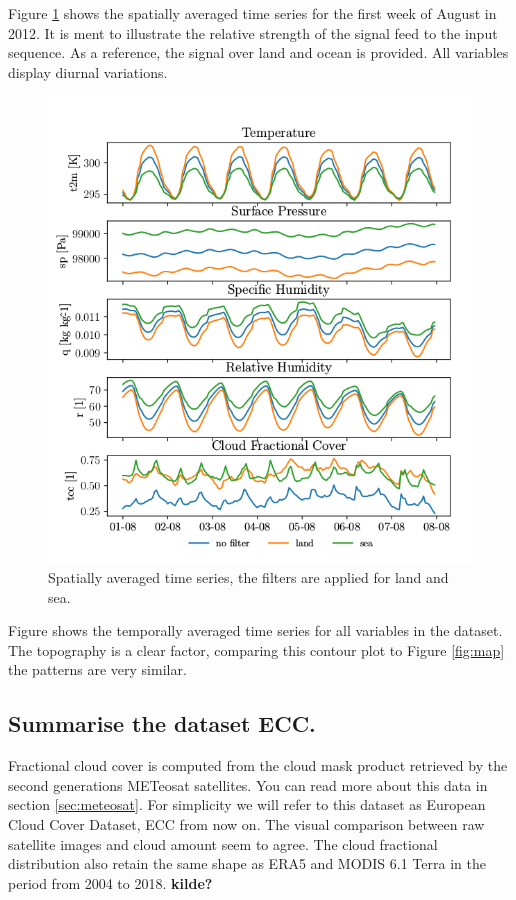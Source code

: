 Figure \ref{fig:random_week} shows the spatially averaged time series for the first week of August in 2012. It is ment to illustrate the relative strength of the signal feed to the input sequence. As a reference, the signal over land and ocean is provided. All variables display diurnal variations.

\begin{figure}[ht]
    \centering
    \includegraphics{python_figs/spatially_averaged_one_week_from_2012-08-01.png}
    \caption{Spatially averaged time series, the filters are applied for land and sea.}
    \label{fig:random_week}
\end{figure}
Figure %
shows the temporally averaged time series for all variables in the dataset. The topography is a clear factor, comparing this contour plot to Figure \ref{fig:map} the patterns are very similar. 





\subsection{Summarise the dataset ECC.}
Fractional cloud cover is computed from the cloud mask product retrieved by the second generations METeosat satellites. You can read more about this data in section \ref{sec:meteosat}. For simplicity we will refer to this dataset as European Cloud Cover Dataset, ECC from now on. The visual comparison between raw satellite images and cloud amount seem to agree. The cloud fractional distribution also retain the same shape as ERA5 and MODIS 6.1 Terra in the period from 2004 to 2018. \textbf{kilde?}

